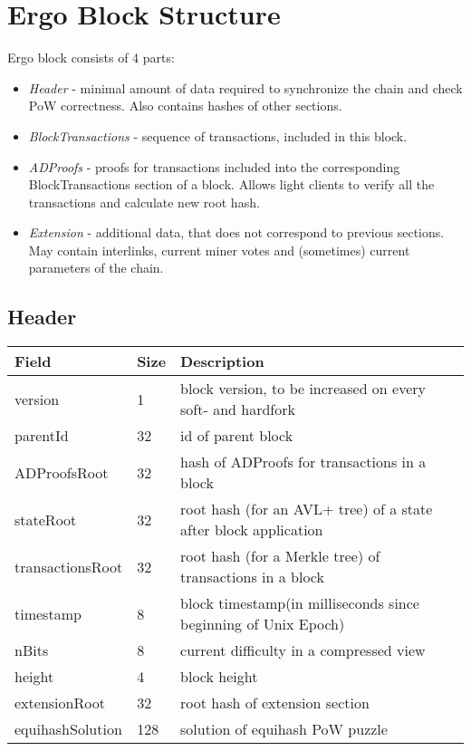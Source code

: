 \section{Ergo Block Structure}
Ergo block consists of 4 parts:

\begin{itemize}
    \item{\em Header } - minimal amount of data required to synchronize the chain and check PoW correctness.
    Also contains hashes of other sections.
    \item{\em BlockTransactions } - sequence of transactions, included in this block.
    \item{\em ADProofs } - proofs for transactions included into the corresponding BlockTransactions section of a block.
    Allows light clients to verify all the transactions and calculate new root hash.
    \item{\em Extension } - additional data, that does not correspond to previous sections.
          May contain interlinks, current miner votes and (sometimes) current parameters of the chain.
\end{itemize}

\subsection{Header}
\vspace{1em}
\begin{tabular}{ |p{2.5cm}||p{0.5cm}|p{7.5cm}|  }
    \hline
    \hline
    Field & Size & Description  \\
    \hline
    version  &  1 &  block version, to be increased on every soft- and hardfork  \\
    \hline
    parentId &  32 &  id of parent block  \\
    \hline
    ADProofsRoot &  32 &  hash of ADProofs for transactions in a block \\
    \hline
    stateRoot &  32 &  root hash (for an AVL+ tree) of a state after block application  \\
    \hline
    transactionsRoot  &  32 &  root hash (for a Merkle tree) of transactions in a block  \\
    \hline
    timestamp &  8 &  block timestamp(in milliseconds since beginning of Unix Epoch)  \\
    \hline
    nBits &  8 & current difficulty in a compressed view  \\
    \hline
    height &  4 & block height  \\
    \hline
    extensionRoot & 32 & root hash of extension section  \\
    \hline
    equihashSolution & 128 & solution of equihash PoW puzzle  \\
    \hline
\end{tabular}

